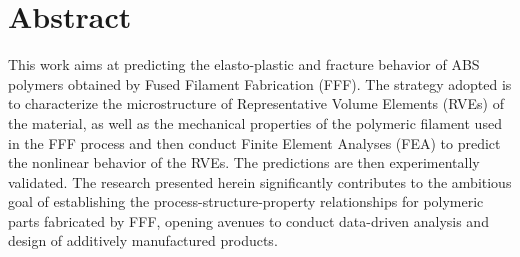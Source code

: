 \chapter*{Abstract}



This work aims at predicting the elasto-plastic and fracture behavior of ABS polymers obtained by Fused Filament Fabrication (FFF). The strategy adopted is to characterize the microstructure of Representative Volume Elements (RVEs) of the material, as well as the mechanical properties of the polymeric filament used in the FFF process and then conduct Finite Element Analyses (FEA) to predict the nonlinear behavior of the RVEs. The predictions are then experimentally validated. The research presented herein significantly contributes to the ambitious goal of establishing the process-structure-property relationships for polymeric parts fabricated by FFF, opening avenues to conduct data-driven analysis and design of additively manufactured products.





